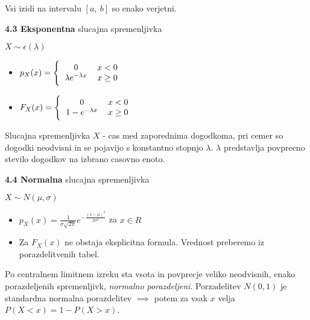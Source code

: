 \documentclass{article}
\begin{document}
\begin{multicols}{3}
Vsi izidi na intervalu $[a,\: b]$ so enako verjetni.

\textbf{4.3 Eksponentna} slucajna spremenljivka
\begin{center}
    \begin{math}
        X \sim \epsilon(\lambda)
    \end{math}
\end{center}

\begin{itemize}
    \item  \begin{math}
        p_{X}(x) =
        \Bigg \{\begin{tabular}{ccc}
          $0$  & $x < 0$ & \\
          $\lambda e^{- \lambda x}$ & $x \geq 0$ & \\
        \end{tabular}
    \end{math} 
    
     \item \begin{math}
        F_{X}(x) =
        \Bigg \{\begin{tabular}{ccc}
          $0$ & $x < 0$ & \\
          $1 - e^{- \lambda x}$ & $x \geq 0$  & \\
        \end{tabular}
    \end{math}
\end{itemize}

Slucajna spremenljivka $X$ - cas med zaporednima dogodkoma,
pri cemer so dogodki neodvisni in se pojavijo s konstantno
stopnjo $\lambda$. $\lambda$ predstavlja povprecno stevilo dogodkov
na izbrano casovno enoto.

\textbf{4.4 Normalna} slucajna spremenljivka
\begin{center}
    \begin{math}
        X \sim N(\mu, \sigma )
    \end{math}
\end{center}

\begin{itemize}
    \item  \begin{math}
        p_{X}(x) = \frac{1}{\sigma \sqrt{2 \pi}} e^{- \frac{(x - \mu)^{2}}{2 \sigma^{2}}}
    \end{math} za $x \in R$ 
    
     \item Za $F_{X}(x)$ ne obstaja eksplicitna formula. Vrednost preberemo iz porazdelitvenih tabel.
\end{itemize}
Po centralnem limitnem izreku sta vsota in povprecje veliko neodvisnih, enako porazdeljenih
spremenljivk, \textit{normalno porazdeljeni}.
Porzadelitev $N(0, 1)$ je standardna normalna porazdelitev $\implies$ potem za vsak $x$ velja
\begin{math}
    P(X < x) = 1 - P(X > x)
\end{math}.


\end{multicols}
\end{document}
